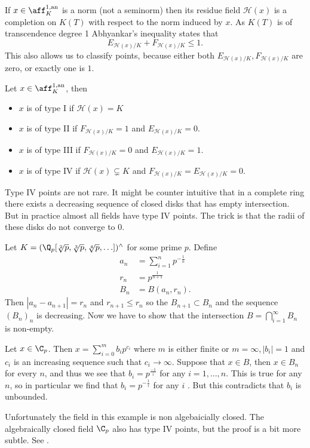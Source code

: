 If $x \in \aff_K^{1, \text{an}}$ is a norm (not a seminorm) then its residue field $\mathcal{H} (x)$ is a completion on $K(T)$ with respect to the norm induced by $x$. As $K(T)$ is of transcendence degree 1 Abhyankar's inequality states that \[
	E_{\mathcal{H} (x) / K} + F_{\mathcal{H} (x) / K} \le 1
.\] 
This also allows us to classify points, because either both $E_{\mathcal{H} (x) / K}, F_{\mathcal{H} (x) / K}$ are zero, or exactly one is $1$. 
\begin{proposition}\label{def:type_points_curve}
	Let $x \in \aff_K^{1, \text{an}}$, then 
	\begin{itemize}
		\item $x$ is of type I if $\mathcal{H} (x) = K$
		\item $x$ is of type II if $F_{\mathcal{H} (x) / K} = 1$ and $E_{\mathcal{H} (x) / K} = 0$. 
		\item $x$ is of type III if $F_{\mathcal{H} (x) / K} = 0$ and $E_{\mathcal{H} (x) / K} = 1$.
		\item $x$ is of type IV if $\mathcal{H} (x) \subsetneq K$ and  $F_{\mathcal{H} (x) / K} = E_{\mathcal{H} (x) / K} = 0$.
	\end{itemize}
\end{proposition}

Type IV points are not rare. It might be counter intuitive that in a complete ring there exists a decreasing sequence of closed disks that has empty intersection. 
But in practice almost all fields have type  IV points. 
The trick is that the radii of these disks do not converge to $0$. 
\begin{example}\label{ex:type4point}
	Let $K = (\Q_p[\sqrt[2]{p} ,\sqrt[3]{p}, \sqrt[4]{p},\ldots])^{\wedge}  $ for some prime $p$. 
	Define 
	\begin{align*}
		a_n &= \sum_{i = 1}^{n} p^{-\frac{1}{n}}\\
		r_n &= p^{\frac{1}{n + 1}} \\
		B_n &= B(a_n, r_n) 
.\end{align*}
Then $|a_n - a_{n + 1}| = r_n$ and $r_{n + 1} \le r_n$ so the $B_{n + 1} \subset B_n$ and the sequence $(B_n)_n$ is decreasing. 
Now we have to show that the intersection $B = \bigcap_{i = 1} ^{\infty} B_n$ is non-empty. 

Let $x \in \C_p$. Then $x = \sum_{i = 0}^{m} b_i p^{c_i}$ where $m$ is either finite or $m = \infty, |b_i| = 1$ and $c_i$ is an increasing sequence such that $c_i \to \infty $. Suppose that  $x \in B$, then $x \in B_n$ for every $n$, and thus we see that  $b_i = p^{\frac{-1}{i}}$ for any $i = 1, \ldots, n$.  
This is true for any $n $, so in particular we find that $b_i = p^{-\frac{1}{i}}$ for any $i$ .
But this contradicts that $b_i$ is unbounded. 

Unfortunately the field in this example is non algebaicially closed. 
The algebraically closed field $\C_p$ also has type IV points, but the proof is a bit more subtle. See \cite[][sec. 3.4]{robertCoursePadicAnalysis2000}.
\end{example}
